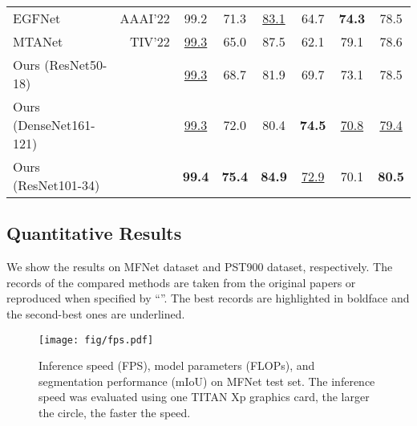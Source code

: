 \documentclass[10.5pt,twocolumn,journal,letterpaper]{IEEEtran}
\begin{document}
\begin{table}[!t]
{\begin{tabular}{l r c c c c c c}
			\rowcolor{maroon}
			EGFNet\cite{zhou-aaai2022-egfnet} & \scriptsize{AAAI'22}  & 99.2 & 71.3 & \underline{83.1} & 64.7 & \textbf{74.3} & 78.5
			\\
			MTANet\cite{zhou-tiv2022-mtanet} & \scriptsize{TIV'22} & \underline{99.3} & 65.0 & 87.5 & 62.1 & 79.1 & 78.6 \\
			\midrule[0.5pt]
			\rowcolor{maroon}Ours (\scriptsize{ResNet50-18}) & &  \underline{99.3} & 68.7 & 81.9 & 69.7 & 73.1 & 78.5 \\
			Ours (\tiny{DenseNet161-121}) & & \underline{99.3} & 72.0 & 80.4 & \textbf{74.5} & \underline{70.8} & \underline{79.4} \\
			\rowcolor{maroon}Ours (\scriptsize{ResNet101-34}) & & \textbf{99.4} & \textbf{75.4} & \textbf{84.9} & \underline{72.9} & 70.1 & \textbf{80.5} \\
			\toprule[0.75pt]
	\end{tabular}
}
\end{table}


\subsection{Quantitative Results}
We show the results on MFNet dataset and PST900 dataset, respectively. The records of the compared methods are taken from the original papers or reproduced when specified by ``''. The best records are highlighted in boldface and the second-best ones are underlined.

\begin{figure}[!t]
	\centering
	\texttt{[image: fig/fps.pdf]}  \caption{Inference speed (FPS), model parameters (FLOPs), and segmentation performance (mIoU) on MFNet test set. The inference speed was evaluated using one TITAN Xp graphics card, the larger the circle, the faster the speed. }
	\label{fig:inference_speed}
\end{figure}
\end{document}

